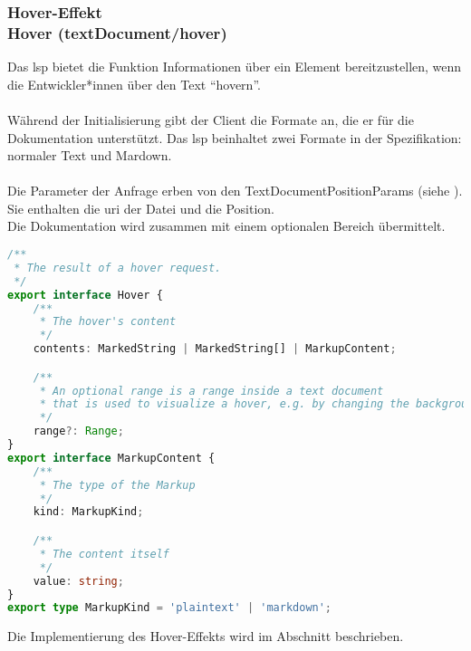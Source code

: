 \documentclass[./einleitung.tex]{subfiles}
\begin{document}
    \subsubsection[Hover-Effekt]{Hover-Effekt\\ {\textnormal{\footnotesize Hover (textDocument/hover) \cite{hover}}}}\label{subsubsec:hover}
    Das \acrshort{lsp} bietet die Funktion Informationen über ein Element bereitzustellen, wenn die Entwickler*innen über den Text ``hovern''.
    \\\\
    Während der Initialisierung gibt der Client die Formate an, die er für die Dokumentation unterstützt.
    Das \acrshort{lsp} beinhaltet zwei Formate in der Spezifikation: normaler Text und Mardown.
    \\\\
    Die Parameter der Anfrage erben von den TextDocumentPositionParams (siehe ).
    Sie enthalten die \acrshort{uri} der Datei und die Position.\\
    Die Dokumentation wird zusammen mit einem optionalen Bereich übermittelt.
    \begin{lstlisting}[language=Typescript, caption=Definition des Hover Ergebnis \cite{hover}, label=lst:hover]
/**
 * The result of a hover request.
 */
export interface Hover {
	/**
	 * The hover's content
	 */
	contents: MarkedString | MarkedString[] | MarkupContent;

	/**
	 * An optional range is a range inside a text document
	 * that is used to visualize a hover, e.g. by changing the background color.
	 */
	range?: Range;
}
export interface MarkupContent {
	/**
	 * The type of the Markup
	 */
	kind: MarkupKind;

	/**
	 * The content itself
	 */
	value: string;
}
export type MarkupKind = 'plaintext' | 'markdown';
    \end{lstlisting}
    Die Implementierung des Hover-Effekts wird im Abschnitt  beschrieben.
\end{document}
